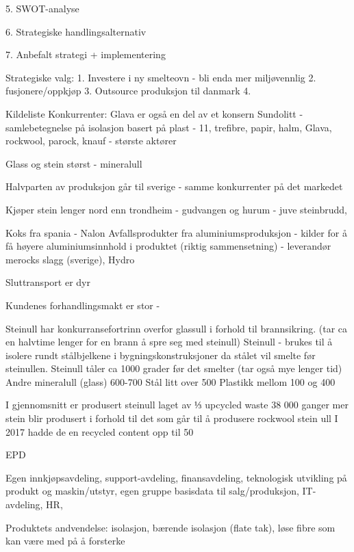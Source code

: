 5. SWOT-analyse

6. Strategiske handlingsalternativ

7. Anbefalt strategi + implementering







Strategiske valg:
1. Investere i ny smelteovn - bli enda mer miljøvennlig
2. fusjonere/oppkjøp
3. Outsource produksjon til danmark
4. 


Kildeliste
Konkurrenter:
Glava er også en del av et konsern
Sundolitt - samlebetegnelse på isolasjon basert på plast - 11, trefibre, papir, halm, 
Glava, rockwool, parock, knauf - største aktører

Glass og stein størst - mineralull

Halvparten av produksjon går til sverige - samme konkurrenter på det markedet

Kjøper stein lenger nord enn trondheim - gudvangen og hurum - juve steinbrudd, 

Koks fra spania - Nalon
Avfallsprodukter fra aluminiumsproduksjon - kilder for å få høyere aluminiumsinnhold i produktet (riktig sammensetning) - leverandør merocks slagg (sverige), Hydro



Sluttransport er dyr

Kundenes forhandlingsmakt er stor -

Steinull har konkurransefortrinn overfor glassull i forhold til brannsikring. (tar ca en halvtime lenger for en brann å spre seg med steinull)
Steinull - brukes til å isolere rundt stålbjelkene i bygningskonstruksjoner da stålet vil smelte før steinullen. 
Steinull tåler ca 1000 grader før det smelter (tar også mye lenger tid)
Andre mineralull (glass) 600-700
Stål litt over 500
Plastikk mellom 100 og 400

I gjennomsnitt er produsert steinull laget av ⅓ upcycled waste
38 000 ganger mer stein blir produsert i forhold til det som går til å produsere rockwool stein ull
I 2017 hadde de en recycled content opp til 50 %

EPD

Egen innkjøpsavdeling, support-avdeling, finansavdeling, teknologisk utvikling på produkt og maskin/utstyr, egen gruppe basisdata til salg/produksjon, IT-avdeling, HR, 

Produktets andvendelse: isolasjon, bærende isolasjon (flate tak), løse fibre som kan være med på å forsterke

